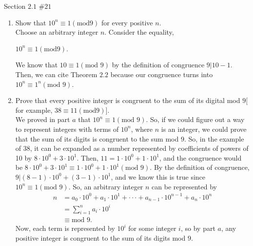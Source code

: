 \documentclass[12pt]{article}
\newenvironment{problem}[2][Problem]{\begin{trivlist}
\item[\hskip \labelsep {\bfseries #1}\hskip \labelsep {\bfseries #2.}]}{\end{trivlist}}
\begin{document}
\begin{problem}{6} Section $2.1$ $\#21$ \\

\noindent
\begin{enumerate}[label=(\alph*)]
\item Show that $10^n \equiv 1 (\text{mod}9)$ for every positive $n$. \\

\noindent
Choose an arbitrary integer $n$. Consider the equality, 
\begin{center}
$10^n \equiv 1 (\text{mod}9)$.
\end{center}
We know that $10 \equiv 1 (\text{mod }9)$ by the definition of congruence $9|10-1$. Then, we can cite Theorem $2.2$ because our congruence turns into $10^n \equiv 1^n (\text{mod }9)$. \qedsymbol

\item Prove that every positive integer is congruent to the sum of its digital mod $9[$ for example, $38 \equiv 11 (\text{mod}9)]$. \\

\noindent
We proved in part $a$ that $10^n \equiv 1 (\text{mod }9)$. So, if we could figure out a way to represent integers with terms of $10^n$, where $n$ is an integer, we could prove that the sum of its digits is congruent to the sum mod $9$. So, in the example of $38$, it can be expanded as a number represented by coefficients of powers of 10 by $8 \cdot 10^0 + 3 \cdot 10^1$. Then, $11=1 \cdot 10^0 + 1 \cdot 10^1$, and the congruence would be $8 \cdot 10^0 + 3 \cdot 10^1 \equiv 1 \cdot 10^0 + 1 \cdot 10^1 (\text{mod } 9)$. By the definition of congruence, $9|(8 - 1) \cdot 10^0 + (3 - 1) \cdot 10^1$, and we know this is true since $10^n \equiv 1 (\text{mod } 9)$. So, an arbitrary integer $n$ can be represented by 
\begin{align*}
n & = a_0 \cdot 10^0 + a_1 \cdot 10^1 + \cdot \cdot \cdot + a_{n-1} \cdot 10^{n-1} + a_n \cdot 10^n \\
& = \sum_{i=1}^{n} a_i \cdot 10^i \\
& \equiv \text{mod } 9.
\end{align*}
\noindent
Now, each term is represented by $10^i$ for some integer $i$, so by part $a$, any positive integer is congruent to the sum of its digits mod $9$. \qedsymbol
\end{enumerate}
\end{problem}
\end{document}
